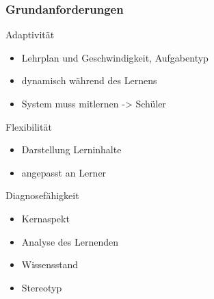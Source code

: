 \documentclass{beamer}
\begin{document}
\begin{frame}
  \frametitle{Grundanforderungen}
  \begin{block}{Adaptivität}
    \begin{itemize}
      \item Lehrplan und Geschwindigkeit, Aufgabentyp
      \item dynamisch während des Lernens
      \item System muss mitlernen -> Schüler
    \end{itemize}
  \end{block}

  \begin{block}{Flexibilität}
    \begin{itemize}
      \item Darstellung Lerninhalte
      \item angepasst an Lerner
    \end{itemize}
  \end{block}

  \begin{block}{Diagnosefähigkeit}
    \begin{itemize}
      \item Kernaspekt
      \item Analyse des Lernenden
      \item Wissensstand
      \item Stereotyp
    \end{itemize}
  \end{block}
\end{frame}
\end{document}
